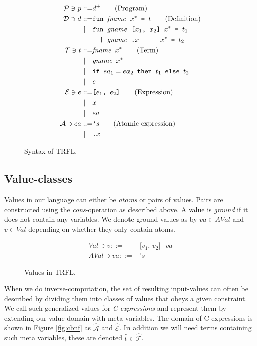 \documentclass[10pt]{../sigplanconf}
\begin{document}
\begin{figure}\centering
  \begin{align*}
    \mathcal{P} \ni p ::= & d^{+}\tag{Program}\\
    \mathcal{D} \ni d ::= &\texttt{fun \textit{\rmfamily fname} $x^{*}$ = $t$}  \tag{Definition} \\
    | \quad &\texttt{fun \textit{\rmfamily gname} [$x_1$, $x_2$] $x^{*}$ = $t_1$} \\
    & \texttt{\ \ | \textit{\rmfamily gname}\ \texttt{.}$x$ \hspace{.7cm} $x^{*}$ = $t_2$}\\
    \mathcal{T} \ni t ::= & \texttt{\textit{\rmfamily fname} $x^{*}$}  \tag{Term}\\
    | \quad & \texttt{\textit{\rmfamily gname} $x^{*}$} \\
    | \quad & \texttt{if $ea_1 = ea_2$ then $t_1$ else $t_2$} \\
    | \quad & e \\
    \mathcal{E} \ni e ::= & \texttt{[$e_1$, $e_2$]} \tag{Expression}\\
    | \quad & x \\
    | \quad & ea \\
    \mathcal{A} \ni ea ::= & \texttt{'}s \tag{Atomic expression}\\
    | \quad & \texttt{.}x
  \end{align*}
  \caption{Syntax of TRFL.}
\label{fig:bnf}
\end{figure}

\subsection{Value-classes}
Values in our language can either be \textit{atoms} or pairs of
values. Pairs are constructed using the \textit{cons}-operation as
described above. A value is \textit{ground} if it does not contain any
variables. We denote ground values as by $va \in AVal$ and $v \in Val$
depending on whether they only contain atoms.

\begin{figure}\centering
  \begin{align*}
    Val \ni v ::= & \texttt{[$v_1$, $v_2$]}\ |\ va\\
    AVal \ni va ::= & \texttt{'}s
  \end{align*}
  \caption{Values in TRFL.}
\label{fig:bnf}
\end{figure}

When we do inverse-computation, the set of resulting input-values can
often be described by dividing them into classes of values that obeys
a given constraint. We call such generalized values for
\textit{C-expressions} and represent them by extending our value
domain with meta-variables. The domain of C-expressions is shown in
Figure \ref{fig:cbnf} as $\mathcal{\widehat{A}}$ and
$\mathcal{\widehat{E}}$. In addition we will need terms containing
such meta variables, these are denoted $\widehat{t} \in
\widehat{\mathcal{T}}$.
\end{document}
